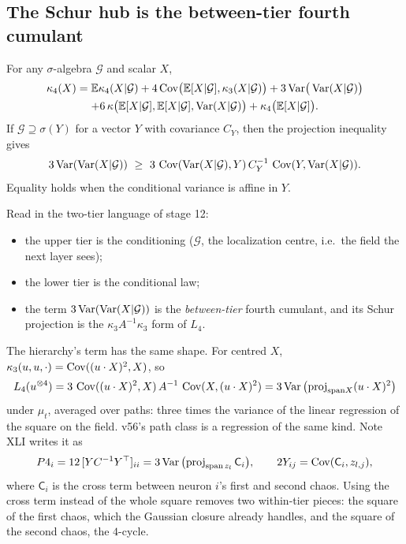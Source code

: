 \subsection{The Schur hub is the between-tier fourth cumulant}
\begin{proposition}\label{prop:static}
For any $\sigma$-algebra $\mathcal G$ and scalar $X$,
\begin{multline*}
\kappa_4(X)=\mathbb E\kappa_4(X|\mathcal G)+4\operatorname{Cov}\!\big(\mathbb E[X|\mathcal G],\kappa_3(X|\mathcal G)\big)+3\operatorname{Var}\!\big(\operatorname{Var}(X|\mathcal G)\big)\\
+6\,\kappa\big(\mathbb E[X|\mathcal G],\mathbb E[X|\mathcal G],\operatorname{Var}(X|\mathcal G)\big)+\kappa_4\big(\mathbb E[X|\mathcal G]\big).
\end{multline*}
If $\mathcal G\supseteq\sigma(Y)$ for a vector $Y$ with covariance $C_Y$, then the projection inequality gives
\[
3\Var(\Var(X|\mathcal G))\ \ge\ 3\,\Cov(\Var(X|\mathcal G),Y)\,C_Y^{-1}\,\Cov(Y,\Var(X|\mathcal G)).
\]
Equality holds when the conditional variance is affine in $Y$.
\end{proposition}
Read in the two-tier language of stage 12:
\begin{itemize}[leftmargin=*]
\item the upper tier is the conditioning ($\mathcal G$, the localization centre, i.e.\ the field the next layer sees);
\item the lower tier is the conditional law;
\item the term $3\operatorname{Var}(\operatorname{Var}(X|\mathcal G))$ is the \emph{between-tier} fourth cumulant, and its Schur projection is the
$\kappa_3A^{-1}\kappa_3$ form of $L_4$.
\end{itemize}
The hierarchy's term has the same shape. For centred $X$, $\kappa_3(u,u,\cdot)=\operatorname{Cov}((u\cdot X)^2,X)$, so
\[
L_4(u^{\otimes4})=3\,\operatorname{Cov}((u\cdot X)^2,X)\,A^{-1}\,\operatorname{Cov}(X,(u\cdot X)^2)=3\operatorname{Var}\big(\mathrm{proj}_{\mathrm{span}X}(u\cdot X)^2\big)
\]
under $\mu_t$, averaged over paths: three times the variance of the linear regression of the square on the field. v56's path class is a
regression of the same kind. Note XLI writes it as
\[
P4_i=12\,[YC^{-1}Y^\top]_{ii}=3\operatorname{Var}\big(\mathrm{proj}_{\mathrm{span}\,z_l}\,\mathsf C_i\big),\qquad 2Y_{ij}=\operatorname{Cov}(\mathsf C_i,z_{l,j}),
\]
where $\mathsf C_i$ is the cross term between neuron $i$'s first and second chaos. Using the cross term instead of the whole square removes two
within-tier pieces: the square of the first chaos, which the Gaussian closure already handles, and the square of the second chaos, the
$4$-cycle.

